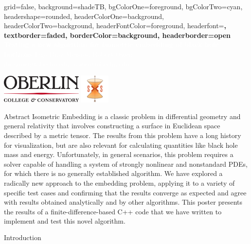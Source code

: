 \documentclass[landscape, paperwidth=60in, paperheight=40in]{baposter}
\begin{document}
	\begin{poster}{
		grid=false,
		background=shadeTB,
		bgColorOne=foreground,
		bgColorTwo=cyan,
		headershape=rounded,
		headerColorOne=background,
		headerColorTwo=background,
		headerFontColor=foreground,
		headerfont=\Large\bf,
		textborder=faded,
		borderColor=background,
		headerborder=open
	}
	{}
	{\bf
		\textcolor{background}{Testing a new algorithm for isometric embedding of black hole horizons}
	}
	{
		\vspace{1em}
		\textcolor{background}{Iago Braz Mendes, Robert Owen\\
		{\smaller ibrazmen@oberlin.edu, rowen@oberlin.edu}}
	}
	{
		\setlength\fboxsep{0pt}
		\setlength\fboxrule{0.5pt}
		\begin{minipage}{15em}
			\includegraphics[width=11em,height=4em]{oberlin-logo}
			\includegraphics[width=4em,height=4em]{sxs-logo}
		\end{minipage}
	}
		\begin{posterbox}[name=abstract,column=0]{Abstract}
			Isometric Embedding is a classic problem in differential geometry and general relativity that involves constructing a surface in Euclidean space described by a metric tensor. The results from this problem have a long history for visualization, but are also relevant for calculating quantities like black hole mass and energy. Unfortunately, in general scenarios, this problem requires a solver capable of handling a system of strongly nonlinear and nonstandard PDEs, for which there is no generally established algorithm. We have explored a radically new approach to the embedding problem, applying it to a variety of specific test cases and confirming that the results converge as expected and agree with results obtained analytically and by other algorithms. This poster presents the results of a finite-difference-based C++ code that we have written to implement and test this novel algorithm.
		\end{posterbox}

		\begin{posterbox}[name=introduction,column=0,below=abstract,above=bottom]{Introduction}
		\end{posterbox}


\end{poster}
\end{document}
